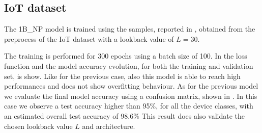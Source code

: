 \subsection{IoT dataset}
\label{iot_final_res}


The 1B\_NP model is trained using the samples, reported in , obtained from the preprocess of the IoT dataset with a lookback value of $L=30$. 

The training is performed for 300 epochs using a batch size of 100. 
In  the loss function and the model accuracy evolution, for both the training and validation set, is show. Like for the previous case, also this model is able to reach high performances and does not show overfitting behaviour. 
As for the previous model we evaluate the final model accuracy using a confusion matrix, shown in . In this case we observe a test accuracy higher than 95\%, for all the device classes, with an estimated overall test accuracy of 98.6\%
This result does also validate the chosen lookback value $L$ and architecture.


%

